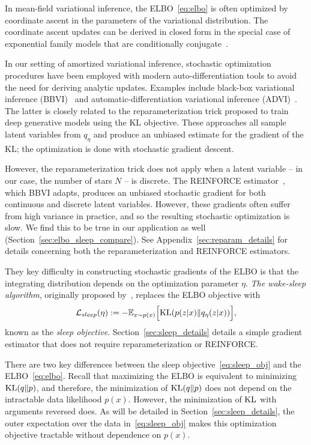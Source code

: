 In mean-field variational inference, the ELBO~\eqref{eq:elbo} is often optimized by coordinate ascent in the parameters of the variational distribution. 
The coordinate ascent updates can be derived in closed form in the special case of exponential family models that are conditionally conjugate~\cite{Blei_2017_vi_review}. 

In our setting of amortized variational inference, stochastic 
optimization procedures have been employed with modern 
auto-differentiation tools to avoid the need for deriving 
analytic updates. Examples include black-box variational inference (BBVI)~\cite{ranganath2013black} 
and automatic-differentiation variational inference (ADVI)~\cite{kucukelbir2016automatic}. The latter 
is closely related to the reparameterization trick \cite{kingma2013autoencoding, rezende2014stochastic} proposed to train deep generative models using the KL objective. 
These approaches all sample latent variables from $q_\eta$ and produce an unbiased estimate 
for the gradient of the KL; the optimization is done with stochastic gradient descent. 

However, the reparameterization trick does not apply when a latent variable -- in our case, the number of stars $N$ -- is discrete. The REINFORCE estimator~\cite{Williams1992reinforce}, which BBVI adapts, produces an unbiased stochastic gradient for both continuous and discrete latent variables.
However, these gradients often suffer from high variance in practice, and so the resulting stochastic optimization is slow. We find this to be true in our application as well (Section~\ref{sec:elbo_sleep_compare}). 
See Appendix~\ref{sec:reparam_details} for details concerning both the reparameterization and REINFORCE estimators. 

They key difficulty in constructing stochastic gradients of the ELBO is that the integrating distribution depends on the optimization parameter $\eta$. 
{\itshape The wake-sleep algorithm}, originally proposed by~\cite{Hinton1995wake_sleep}, replaces the 
ELBO objective with 
\begin{align}
    \mathcal{L}_{sleep}(\eta) := 
    - \mathbb{E}_{x \sim p(x)}\Big[\textrm{KL}(p(z | x) \| q_\eta(z | x))\Big]
    \label{eq:sleep_obj},
\end{align}
known as the {\itshape sleep objective}.  Section~\ref{sec:sleep_details} details a simple gradient estimator that does not require reparameterization or REINFORCE. 

There are two key differences between the sleep objective~\eqref{eq:sleep_obj} and the ELBO~\eqref{eq:elbo}. 
Recall that maximizing the ELBO is equivalent to minimizing
$\textrm{KL}(q\|p)$, and 
therefore, the minimization of $\textrm{KL}(q\|p)$ does not depend on the intractable data likelihood $p(x)$. 
However, the minimization of $\textrm{KL}$ with arguments reversed does. 
As will be detailed in Section~\ref{sec:sleep_details}, the outer expectation over the data in~\eqref{eq:sleep_obj} makes this optimization objective tractable without dependence on $p(x)$. 

